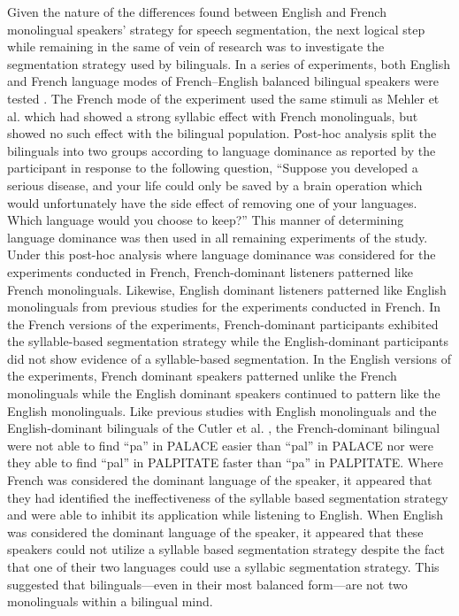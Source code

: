 Given the nature of the differences found between English and French monolingual speakers’ strategy for speech segmentation, the next logical step while remaining in the same of vein of research was to investigate the segmentation strategy used by bilinguals. In a series of experiments, both English and French language modes of French–English balanced bilingual speakers were tested \parencite{Cutler1992-qq}. The French mode of the experiment used the same stimuli as Mehler et al. \parencite*{Mehler1981-vi} which had showed a strong syllabic effect with French monolinguals, but showed no such effect with the bilingual population. Post-hoc analysis split the bilinguals into two groups according to language dominance as reported by the participant in response to the following question, “Suppose you developed a serious disease, and your life could only be saved by a brain operation which would unfortunately have the side effect of removing one of your languages. Which language would you choose to keep?” This manner of determining language dominance was then used in all remaining experiments of the study. Under this post-hoc analysis where language dominance was considered for the experiments conducted in French, French-dominant listeners patterned like French monolinguals. Likewise, English dominant listeners patterned like English monolinguals from previous studies for the experiments conducted in French. In the French versions of the experiments, French-dominant participants exhibited the syllable-based segmentation strategy while the English-dominant participants did not show evidence of a syllable-based segmentation.  In the English versions of the experiments, French dominant speakers patterned unlike the French monolinguals while the English dominant speakers continued to pattern like the English monolinguals. Like previous studies with English monolinguals and the English-dominant bilinguals of the Cutler et al. \parencite*{Cutler1986-zl}, the French-dominant bilingual were not able to find “pa” in PALACE easier than “pal” in PALACE nor were they able to find “pal” in PALPITATE faster than “pa” in PALPITATE. Where French was considered the dominant language of the speaker, it appeared that they had identified the ineffectiveness of the syllable based segmentation strategy and were able to inhibit its application while listening to English. When English was considered the dominant language of the speaker, it appeared that these speakers could not utilize a syllable based segmentation strategy despite the fact that one of their two languages could use a syllabic segmentation strategy.  This suggested that bilinguals—even in their most balanced form—are not two monolinguals within a bilingual mind.
